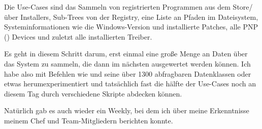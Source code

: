 Die Use-Cases sind das Sammeln von registrierten Programmen aus dem Store/über Installers, Sub-Trees von der Registry, eine Liste an Pfaden im Dateisystem, Systeminformationen wie die Windows-Version und installierte Patches, alle PNP () Devices und zuletzt alle installierten Treiber.

Es geht in diesem Schritt darum, erst einmal eine große Menge an Daten über das System zu sammeln, die dann im nächsten ausgewertet werden können.
Ich habe also mit Befehlen wie  und seine über 1300 abfragbaren Datenklassen oder  etwas herumexperimentiert und tatsächlich fast die hälfte der Use-Cases noch an diesem Tag durch verschiedene Skripte abdecken können.

Natürlich gab es auch wieder ein Weekly, bei dem ich über meine Erkenntnisse meinem Chef und Team-Mitgliedern berichten konnte.
